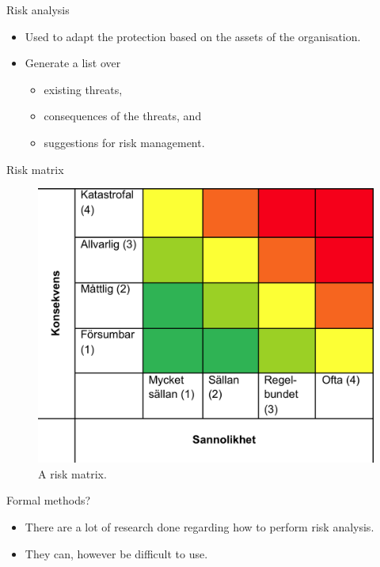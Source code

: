 \documentclass{beamer}
\begin{document}
\begin{frame}{Risk analysis}
  \begin{itemize}
    \item Used to adapt the protection based on the assets of the organisation.
    \item Generate a list over
      \begin{itemize}
        \item existing threats,
        \item consequences of the threats, and
        \item suggestions for risk management.
      \end{itemize}
  \end{itemize}
\end{frame}

\begin{frame}{Risk matrix}
  \begin{figure}
    \includegraphics[height=0.7\textheight]{riskmatris.png}
    \caption{A risk matrix.}
  \end{figure}
\end{frame}

\begin{frame}{Formal methods?}
  \begin{itemize}
    \item There are a lot of research done regarding how to perform risk
      analysis.
    \item They can, however be difficult to use.
  \end{itemize}
\end{frame}
\end{document}
